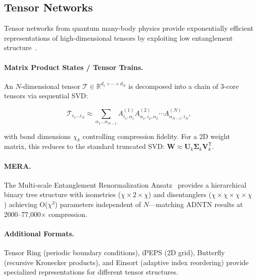 \documentclass[11pt,a4paper,twocolumn]{article}
\begin{document}
\subsection{Tensor Networks}
\label{sec:tensornet}

Tensor networks from quantum many-body physics provide exponentially efficient representations of high-dimensional tensors by exploiting low entanglement structure~\cite{orús2014practical}.

\paragraph{Matrix Product States / Tensor Trains.}
An $N$-dimensional tensor $\mathcal{T} \in \mathbb{R}^{d_1 \times \cdots \times d_N}$ is decomposed into a chain of 3-core tensors via sequential SVD:

\begin{equation}
	\label{eq:mps}
	\mathcal{T}_{i_1\ldots i_N} \approx \sum_{\alpha_1\ldots\alpha_{N-1}} A^{(1)}_{i_1,\alpha_1} A^{(2)}_{\alpha_1,i_2,\alpha_2} \cdots A^{(N)}_{\alpha_{N-1},i_N},
\end{equation}

with bond dimensions $\chi_k$ controlling compression fidelity. For a 2D weight matrix, this reduces to the standard truncated SVD: $\mathbf{W} \approx \mathbf{U}_k \mathbf{\Sigma}_k \mathbf{V}_k^\mathsf{T}$.

\paragraph{MERA.}
The Multi-scale Entanglement Renormalization Ansatz~\cite{vidal2007entanglement} provides a hierarchical binary tree structure with isometries ($\chi \times 2 \times \chi$) and disentanglers ($\chi \times \chi \times \chi \times \chi$) achieving O($\chi^3$) parameters independent of $N$---matching ADNTN results at 2000--77,000$\times$ compression.

\paragraph{Additional Formats.}
Tensor Ring (periodic boundary conditions), iPEPS (2D grid), Butterfly (recursive Kronecker products), and Einsort (adaptive index reordering) provide specialized representations for different tensor structures.
\end{document}
